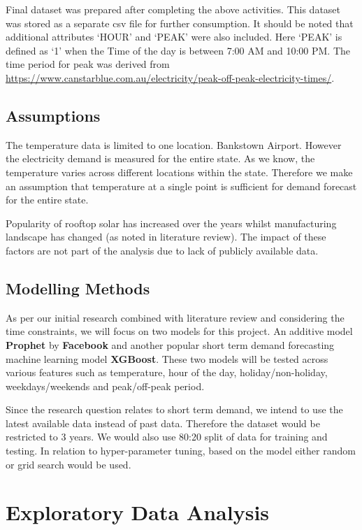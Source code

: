 \documentclass[mstat,12pt]{unswthesis}
\begin{document}
Final dataset was prepared after completing the above activities. This
dataset was stored as a separate csv file for further consumption. It
should be noted that additional attributes `HOUR' and `PEAK' were also
included. Here `PEAK' is defined as `1' when the Time of the day is
between 7:00 AM and 10:00 PM. The time period for peak was derived from
\url{https://www.canstarblue.com.au/electricity/peak-off-peak-electricity-times/}.

\section{Assumptions}\label{assumptions}

The temperature data is limited to one location. Bankstown Airport.
However the electricity demand is measured for the entire state. As we
know, the temperature varies across different locations within the
state. Therefore we make an assumption that temperature at a single
point is sufficient for demand forecast for the entire state.

Popularity of rooftop solar has increased over the years whilst
manufacturing landscape has changed (as noted in literature review). The
impact of these factors are not part of the analysis due to lack of
publicly available data.

\section{Modelling Methods}\label{modelling-methods}

As per our initial research combined with literature review and
considering the time constraints, we will focus on two models for this
project. An additive model \textbf{Prophet} by \textbf{Facebook} and
another popular short term demand forecasting machine learning model
\textbf{XGBoost}. These two models will be tested across various
features such as temperature, hour of the day, holiday/non-holiday,
weekdays/weekends and peak/off-peak period.

Since the research question relates to short term demand, we intend to
use the latest available data instead of past data. Therefore the
dataset would be restricted to 3 years. We would also use 80:20 split of
data for training and testing. In relation to hyper-parameter tuning,
based on the model either random or grid search would be used.

\chapter{Exploratory Data Analysis}\label{exploratory-data-analysis}
\end{document}
